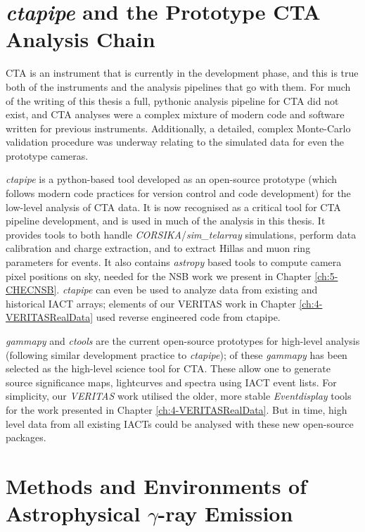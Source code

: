 \section{\textit{ctapipe} and the Prototype CTA Analysis Chain}

CTA is an instrument that is currently in the development phase, and this is true both of the instruments and the analysis pipelines that go with them. For much of the writing of this thesis a full, pythonic analysis pipeline for CTA did not exist, and CTA analyses were a complex mixture of modern code and software written for previous instruments. Additionally, a detailed, complex Monte-Carlo validation procedure was underway relating to the simulated data for even the prototype cameras.

\textit{ctapipe} is a python-based tool developed as an open-source prototype (which follows modern code practices for version control and code development) for the low-level analysis of CTA data. It is now recognised as a critical tool for CTA pipeline development, and is used in much of the analysis in this thesis. It provides tools to both handle \textit{CORSIKA}/\textit{sim\_telarray} simulations, perform data calibration and charge extraction, and to extract Hillas and muon ring parameters for events. It also contains \textit{astropy} based tools to compute camera pixel positions on sky, needed for the NSB work we present in Chapter \ref{ch:5-CHECNSB}. \textit{ctapipe} can even be used to analyze data from existing and historical IACT arrays; elements of our VERITAS work in Chapter \ref{ch:4-VERITASRealData} used reverse engineered code from ctapipe.

\textit{gammapy} and \textit{ctools} are the current open-source prototypes for high-level analysis (following similar development practice to \textit{ctapipe}); of these \textit{gammapy} has been selected as the high-level science tool for CTA. These allow one to generate source significance maps, lightcurves and spectra using IACT event lists. For simplicity, our \textit{VERITAS} work utilised the older, more stable \textit{Eventdisplay} tools for the work presented in Chapter \ref{ch:4-VERITASRealData}. But in time, high level data from all existing IACTs could be analysed with these new open-source packages.

\section{Methods and Environments of Astrophysical \ensuremath{\gamma}-ray Emission}
